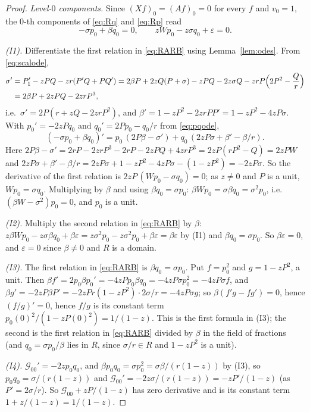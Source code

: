 \documentclass[11pt]{article}
\theoremstyle{definition}
\theoremstyle{remark}
\begin{document}
\begin{proof}
\emph{Level-$0$ components.} Since $(Xf)_0=(Af)_0=0$ for every $f$ and $v_0=1$, the $0$-th components of \eqref{eq:Rq} and \eqref{eq:Rp} read
\begin{equation}\label{eq:RARB}
-\sigma p_0+\beta q_0=0,\qquad zWp_0-z\sigma q_0+\varepsilon=0.
\end{equation}

\emph{(I1).} Differentiate the first relation in \eqref{eq:RARB} using Lemma~\ref{lem:odes}. From \eqref{eq:scalode},
\begin{align*}
\sigma'&=P_1'-zPQ-zr(P'Q+PQ')=2\beta P+2zQ(P+\sigma)-zPQ-2z\sigma Q-zrP\Bigl(2P^2-\frac Qr\Bigr)\\
&=2\beta P+2zPQ-2zrP^3,
\end{align*}
i.e.\ $\sigma'=2P(r+zQ-2zrP^2)$, and $\beta'=1-zP^2-2zrPP'=1-zP^2-4zP\sigma$. With $p_0'=-2zPq_0$ and $q_0'=2Pp_0-q_0/r$ from \eqref{eq:pqode},
\[
(-\sigma p_0+\beta q_0)'=p_0\,(2P\beta-\sigma')+q_0\,(2zP\sigma+\beta'-\beta/r).
\]
Here $2P\beta-\sigma'=2rP-2zrP^3-2rP-2zPQ+4zrP^3=2zP(rP^2-Q)=2zPW$ and $2zP\sigma+\beta'-\beta/r=2zP\sigma+1-zP^2-4zP\sigma-(1-zP^2)=-2zP\sigma$. So the derivative of the first relation is $2zP\,(Wp_0-\sigma q_0)=0$; as $z\ne0$ and $P$ is a unit, $Wp_0=\sigma q_0$. Multiplying by $\beta$ and using $\beta q_0=\sigma p_0$: $\beta Wp_0=\sigma\beta q_0=\sigma^2p_0$, i.e.\ $(\beta W-\sigma^2)p_0=0$, and $p_0$ is a unit.

\emph{(I2).} Multiply the second relation in \eqref{eq:RARB} by $\beta$: $z\beta Wp_0-z\sigma\beta q_0+\beta\varepsilon=z\sigma^2p_0-z\sigma^2p_0+\beta\varepsilon=\beta\varepsilon$ by (I1) and $\beta q_0=\sigma p_0$. So $\beta\varepsilon=0$, and $\varepsilon=0$ since $\beta\ne0$ and $R$ is a domain.

\emph{(I3).} The first relation in \eqref{eq:RARB} is $\beta q_0=\sigma p_0$. Put $f=p_0^2$ and $g=1-zP^2$, a unit. Then $\beta f'=2p_0\beta p_0'=-4zPp_0\beta q_0=-4zP\sigma p_0^2=-4zP\sigma f$, and $\beta g'=-2zP\beta P'=-2zPr(1-zP^2)\cdot2\sigma/r=-4zP\sigma g$; so $\beta(f'g-fg')=0$, hence $(f/g)'=0$, hence $f/g$ is its constant term $p_0(0)^2/(1-zP(0)^2)=1/(1-z)$. This is the first formula in (I3); the second is the first relation in \eqref{eq:RARB} divided by $\beta$ in the field of fractions (and $q_0=\sigma p_0/\beta$ lies in $R$, since $\sigma/r\in R$ and $1-zP^2$ is a unit).

\emph{(I4).} $\mathcal G_{00}'=-2zp_0q_0$, and $\beta p_0q_0=\sigma p_0^2=\sigma\beta/(r(1-z))$ by (I3), so $p_0q_0=\sigma/(r(1-z))$ and $\mathcal G_{00}'=-2z\sigma/(r(1-z))=-zP'/(1-z)$ (as $P'=2\sigma/r$). So $\mathcal G_{00}+zP/(1-z)$ has zero derivative and is its constant term $1+z/(1-z)=1/(1-z)$.
\end{proof}
\end{document}
